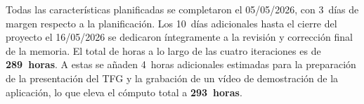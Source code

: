 Todas las características planificadas se completaron el 05/05/2026, con 3~días de margen respecto a la planificación. Los 10~días adicionales hasta el cierre del proyecto el 16/05/2026 se dedicaron íntegramente a la revisión y corrección final de la memoria. El total de horas a lo largo de las cuatro iteraciones es de \textbf{289~horas}. A estas se añaden 4~horas adicionales estimadas para la preparación de la presentación del TFG y la grabación de un vídeo de demostración de la aplicación, lo que eleva el cómputo total a \textbf{293~horas}.



